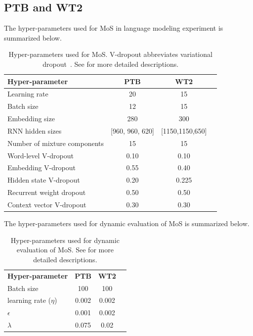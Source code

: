 \subsection{PTB and WT2}
\label{sec:a-exp-sota}
The hyper-parameters used for MoS in language modeling experiment is summarized below.
\begin{table}[!h]
	\small
	\centering
	\begin{tabular}{l|ccc }
		\toprule
		\bf Hyper-parameter & \bf PTB & \bf WT2 \\ 
		\midrule
		Learning rate & 20 & 15 & \\
		Batch size & 12 & 15 & \\
		Embedding size & 280 & 300 \\ 
		RNN hidden sizes & [960, 960, 620] & [1150,1150,650] \\
		Number of mixture components & 15 & 15 \\
		\midrule
		Word-level V-dropout & 0.10 & 0.10 \\
		Embedding V-dropout & 0.55 & 0.40 \\
		Hidden state V-dropout & 0.20 & 0.225\\
		Recurrent weight dropout~\citep{wan2013regularization} & 0.50 & 0.50 \\
		Context vector V-dropout & 0.30 & 0.30 \\
		\bottomrule
	\end{tabular}
	\caption{\small
		Hyper-parameters used for MoS. V-dropout abbreviates variational dropout~\citep{gal2016theoretically}. See \citep{merity2017regularizing} for more detailed descriptions.
	}
	\label{table:hyper-sota-train}
	\vspace{-1em}
\end{table}

The hyper-parameters used for dynamic evaluation of MoS is summarized below.
\begin{table}[!h]
	\small
	\centering
	\begin{tabular}{l|ccc }
		\toprule
		\bf Hyper-parameter & \bf PTB & \bf WT2 \\ 
		Batch size & 100 & 100\\
		learning rate ($\eta$) & 0.002 & 0.002 \\
		$\epsilon$ &0.001 & 0.002 \\
		$\lambda$ &0.075 & 0.02 \\
		\bottomrule
	\end{tabular}
	\caption{\small
		Hyper-parameters used for dynamic evaluation of MoS. See \citep{krause2017dynamic} for more detailed descriptions.
	}
	\label{table:hyper-sota-dyeval}
	\vspace{-1em}
\end{table}

